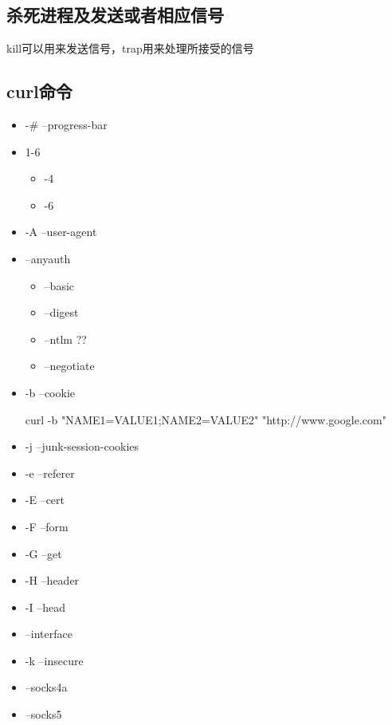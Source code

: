 \subsection{杀死进程及发送或者相应信号}

kill可以用来发送信号，trap用来处理所接受的信号


\subsection{curl命令}


\begin{itemize}
\item -# --progress-bar
\item 1-6
	\begin{itemize}
	\item -4
	\item -6
	\end{itemize}
\item -A --user-agent
\item --anyauth
	\begin{itemize}
	\item --basic
	\item --digest
	\item --ntlm ??
	\item --negotiate
	\end{itemize}	
\item -b --cookie
\begin{Bash}
curl -b "NAME1=VALUE1;NAME2=VALUE2" "http://www.google.com"
\end{Bash}	
\item -j --junk-session-cookies

\item -e --referer
\item -E --cert
\item -F --form

\item -G --get
\item -H --header

\item -I --head

\item --interface

\item -k --insecure

\item --socks4a
\item --socks5


\end{itemize}
